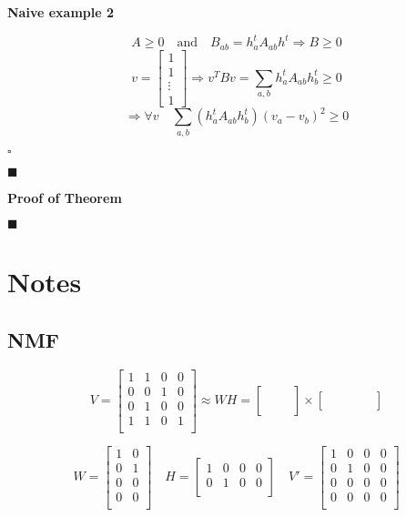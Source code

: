 \documentclass{extreport}
\begin{document}
\textbf{Naive example 2}

\[
  A \geqslant 0 \quad \text{and} \quad
  B_{ab} = h_a^tA_{ab}h^t
  \Rightarrow B \geqslant 0
\]
\[
  v =
  \begin{bmatrix}
    1 \\ 1 \\ \vdots \\ 1
  \end{bmatrix} \Rightarrow
  v^TBv = \sum_{a,b} h_a^tA_{ab}h_b^t \geqslant 0
\]
\[
  \Rightarrow \forall v \quad
  \sum_{a,b}\left(h_a^tA_{ab}h_b^t\right) (v_a - v_b)^2 \geqslant 0
\]

$\square$

$\blacksquare$

\textbf{Proof of Theorem}

$\blacksquare$

\section{Notes}

\subsection{NMF}

\[
  V =
  \begin{bmatrix}
    1 & 1 & 0 & 0 \\
    0 & 0 & 1 & 0 \\
    0 & 1 & 0 & 0 \\
    1 & 1 & 0 & 1 \\
  \end{bmatrix}
  \approx WH =
  \begin{bmatrix}
    & & \\
    & & \\
    & & \\
    & & \\
  \end{bmatrix}
  \times
  \begin{bmatrix}
    & & & & \\
    & & & & \\
  \end{bmatrix}
\]

\[
  W =
  \begin{bmatrix}
    1 & 0 \\
    0 & 1 \\
    0 & 0 \\
    0 & 0 \\
  \end{bmatrix} \quad
  H =
  \begin{bmatrix}
    1 & 0 & 0 & 0 \\
    0 & 1 & 0 & 0 \\
  \end{bmatrix} \quad
  V' =
  \begin{bmatrix}
    1 & 0 & 0 & 0 \\
    0 & 1 & 0 & 0 \\
    0 & 0 & 0 & 0 \\
    0 & 0 & 0 & 0 \\
  \end{bmatrix}
\]
\end{document}
